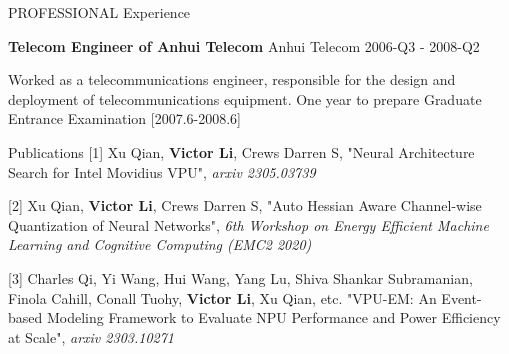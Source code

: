 \documentclass{resume} %
\begin{document}
\begin{rSection}{PROFESSIONAL Experience}
\begin{itemize}
\end{itemize}

\textbf{Telecom Engineer of Anhui Telecom} \hfill Anhui Telecom 2006-Q3 - 2008-Q2

Worked as a telecommunications engineer, responsible for the design and deployment of telecommunications equipment.
One year to prepare Graduate Entrance Examination [2007.6-2008.6]

\end{rSection} 

\begin{rSection}{Publications}{}
[1] Xu Qian, \textbf{Victor Li}, Crews Darren S, "Neural Architecture Search for Intel Movidius VPU", \textit{arxiv 2305.03739}

[2] Xu Qian, \textbf{Victor Li}, Crews Darren S, "Auto Hessian Aware Channel-wise Quantization of Neural Networks", \textit{6th Workshop on Energy Efficient Machine Learning and Cognitive Computing (EMC2 2020)}

[3] Charles Qi, Yi Wang, Hui Wang, Yang Lu, Shiva Shankar Subramanian, Finola Cahill, Conall Tuohy, \textbf{Victor Li}, {Xu Qian}, etc. "VPU-EM: An Event-based Modeling Framework to Evaluate NPU Performance and Power Efficiency at Scale", \textit{arxiv 2303.10271}
\end{rSection}
\end{document}
